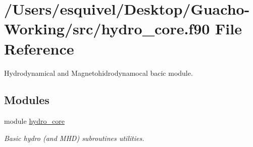\hypertarget{hydro__core_8f90}{}\section{/\+Users/esquivel/\+Desktop/\+Guacho-\/\+Working/src/hydro\+\_\+core.f90 File Reference}
\label{hydro__core_8f90}


Hydrodynamical and Magnetohidrodynamocal bacic module.  


\subsection*{Modules}
\begin{DoxyCompactItemize}
\item 
module \hyperlink{namespacehydro__core}{hydro\+\_\+core}
\begin{DoxyCompactList}\small\item\em Basic hydro (and M\+H\+D) subroutines utilities. \end{DoxyCompactList}\end{DoxyCompactItemize}
